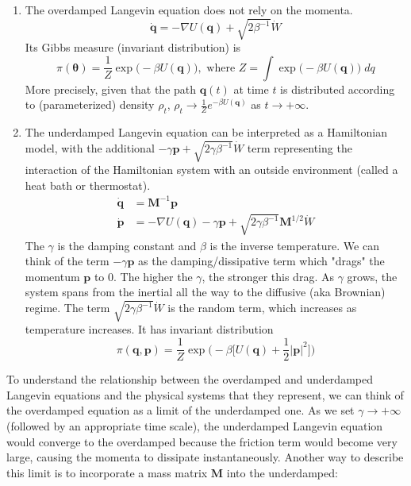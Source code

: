     \begin{enumerate}
      \item The overdamped Langevin equation does not rely on the momenta. 
      \begin{equation}
        \mathbf{\dot{q}} = - \nabla U(\mathbf{q}) + \sqrt{2 \beta^{-1}} \dot{W}
      \end{equation}
      Its Gibbs measure (invariant distribution) is 
      \begin{equation}
        \pi(\boldsymbol{\theta}) = \frac{1}{Z} \exp\big( - \beta U(\mathbf{q})\big), \text{ where } Z = \int \exp\big( - \beta U(\mathbf{q})\big)\; dq
      \end{equation}
      More precisely, given that the path $\mathbf{q}(t)$ at time $t$ is distributed according to (parameterized) density $\rho_t$, $\rho_t \rightarrow \frac{1}{Z} e^{-\beta U(\mathbf{q})}$ as $t \rightarrow +\infty$. 
      \item The underdamped Langevin equation can be interpreted as a Hamiltonian model, with the additional $- \gamma \mathbf{p} + \sqrt{2\gamma \beta^{-1}} \dot{W}$ term representing the interaction of the Hamiltonian system with an outside environment (called a heat bath or thermostat). 
      \begin{align*}
        \mathbf{\dot{q}} & = \mathbf{M}^{-1} \mathbf{p} \\
        \mathbf{\dot{p}} & = - \nabla U(\mathbf{q}) - \gamma \mathbf{p} + \sqrt{2\gamma \beta^{-1}} \mathbf{M}^{1/2} \dot{W}
      \end{align*}
      The $\gamma$ is the damping constant and $\beta$ is the inverse temperature. We can think of the term $-\gamma \mathbf{p}$ as the damping/dissipative term which "drags" the momentum $\mathbf{p}$ to $0$. The higher the $\gamma$, the stronger this drag. As $\gamma$ grows, the system spans from the inertial all the way to the diffusive (aka Brownian) regime. The term $\sqrt{2 \gamma \beta^{-1}} \dot{W}$ is the random term, which increases as temperature increases. It has invariant distribution 
      \begin{equation}
        \pi(\boldsymbol{q}, \boldsymbol{p}) = \frac{1}{Z} \exp\big( -\beta \big[ U(\mathbf{q}) + \frac{1}{2} |\mathbf{p}|^2\big] \big)
      \end{equation}
    \end{enumerate}
    To understand the relationship between the overdamped and underdamped Langevin equations and the physical systems that they represent, we can think of the overdamped equation as a limit of the underdamped one. As we set $\gamma \rightarrow +\infty$ (followed by an appropriate time scale), the underdamped Langevin equation would converge to the overdamped because the friction term would become very large, causing the momenta to dissipate instantaneously. Another way to describe this limit is to incorporate a mass matrix $\mathbf{M}$ into the underdamped: 
